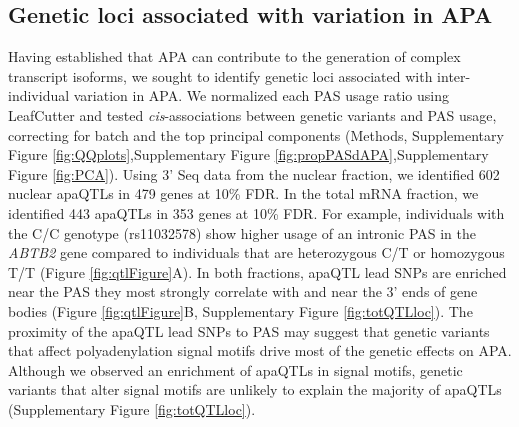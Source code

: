 \begin{figure}[!htb]
\end{figure}
  
  


\subsection{Genetic loci associated with variation in APA}\label{apa-QTLs}

Having established that APA can contribute to the generation of complex transcript isoforms, we sought to identify genetic loci associated with inter-individual variation in APA. We normalized each PAS usage ratio using LeafCutter  \citep{li_annotation-free_2018} and tested {\it cis}-associations between genetic variants and PAS usage, correcting for batch and the top principal components (Methods, Supplementary Figure \ref{fig:QQplots},Supplementary Figure \ref{fig:propPASdAPA},Supplementary Figure \ref{fig:PCA}). Using 3' Seq data from the nuclear fraction, we identified 602 nuclear apaQTLs in 479 genes at 10\% FDR. In the total mRNA fraction, we identified 443 apaQTLs in 353 genes at 10\% FDR. For example, individuals with the C/C genotype (rs11032578) show higher usage of an intronic PAS in the {\it ABTB2} gene compared to individuals that are heterozygous C/T or homozygous T/T (Figure \ref{fig:qtlFigure}A). In both fractions, apaQTL lead SNPs are enriched near the PAS they most strongly correlate with and near the 3' ends of gene bodies (Figure \ref{fig:qtlFigure}B, Supplementary Figure \ref{fig:totQTLloc}). The proximity of the apaQTL lead SNPs to PAS may suggest that genetic variants that affect polyadenylation signal motifs drive most of the genetic effects on APA. Although we observed an enrichment of apaQTLs in signal motifs, genetic variants that alter signal motifs are unlikely to explain the majority of apaQTLs (Supplementary Figure \ref{fig:totQTLloc}).

